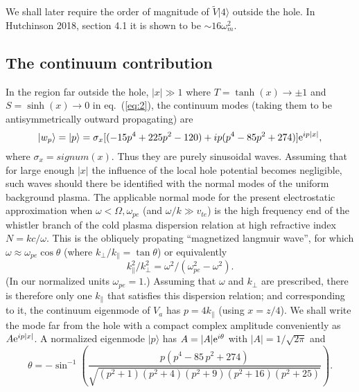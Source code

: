\documentclass[12pt]{article}
\def\ket#1{|#1\rangle}
\def\etothe#1{{\rm e}^{#1}}
\begin{document}
We shall later require  the order of magnitude of $\tilde V\ket{4}$
outside the hole.  In Hutchinson 2018,
section 4.1 it is shown to be $\sim 16\omega_m^2$.


\subsection{The continuum contribution}

In the region far outside the hole, $|x|\gg 1$ where
$T=\tanh(x)\to\pm1$ and $S=\sinh(x)\to0$ in eq.\ (\ref{eq:2}), the continuum
modes (taking them to be antisymmetrically outward propagating) are
\begin{equation}
  \label{eq:14}
 \ket{w_p}= \ket{p}=\sigma_x [(-15p^4+225p^2-120)+ip(p^4-85p^2+274)]{\rm e}^{ip|x|},
\end{equation}
where $\sigma_x=signum(x)$. Thus they are purely sinusoidal
waves. Assuming that for large enough $|x|$ the influence of the local
hole potential becomes negligible, such waves should there be
identified with the normal modes of the uniform background plasma.
The applicable normal mode for the present electrostatic approximation
when $\omega<\Omega,\omega_{pe}$ (and $\omega/k\gg v_{te}$) is the high
frequency end of the whistler branch of the cold plasma dispersion
relation at high refractive index $N=kc/\omega$. This is the obliquely
propating ``magnetized langmuir wave'', for which
$\omega\approx\omega_{pe}\cos\theta$ (where
$k_\perp/k_\parallel=\tan\theta$) or equivalently
\begin{equation}
  \label{eq:15}
  k_\parallel^2/k_\perp^2=\omega^2/(\omega_{pe}^2-\omega^2).
\end{equation}
(In our normalized units $\omega_{pe}=1$.)  Assuming that $\omega$ and
$k_\perp$ are prescribed, there is therefore only one $k_\parallel$
that satisfies this dispersion relation; and corresponding to it, the
continuum eigenmode of $V_a$ has $p=4k_\parallel$ (using $x=z/4$). We
shall write the mode far from the hole with a compact complex
amplitude conveniently as $A{\rm e}^{ip|x|}$. A normalized
eigenmode $\ket{p}$ has $A=|A|\etothe{i\theta}$ with $|A|=1/\sqrt{2\pi}$
and
\begin{equation}
  \label{eq:19}
  \theta=-\sin^{-1} \left(\frac{ p\left( p^{4}-85\,p^{2}+274 \right) }
      { \sqrt{ \left( p^{2}+1 \right)  \left( p^{2}+4 \right)
          \left( p^{2}+9 \right)  \left( p^{2}+16 \right)  \left(
            p^{2}+25 \right)} }\right).
\end{equation}
\end{document}
